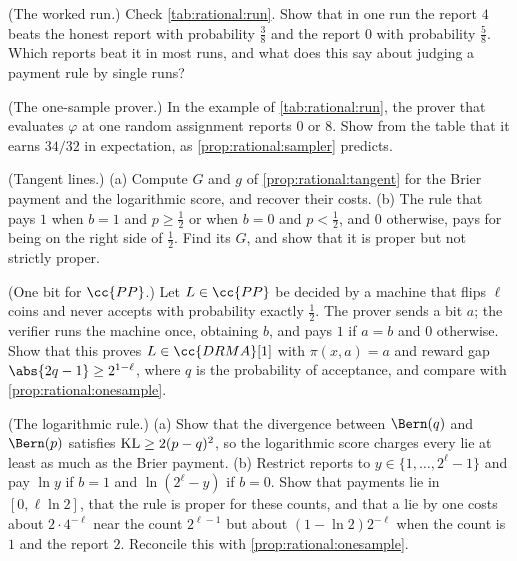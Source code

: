 \begin{refsection}
\begin{exercises}
\item \consolidation (The worked run.) Check \cref{tab:rational:run}. Show that in one run the report $4$ beats the honest report with probability $\frac38$ and the report $0$ with probability $\frac58$. Which reports beat it in most runs, and what does this say about judging a payment rule by single runs?\label{ex:rational:run}

\item \consolidation (The one-sample prover.) In the example of \cref{tab:rational:run}, the prover that evaluates $\varphi$ at one random assignment reports $0$ or $8$. Show from the table that it earns $34/32$ in expectation, as \cref{prop:rational:sampler} predicts.\label{ex:rational:onesampler}

\item \consolidation (Tangent lines.) (a) Compute $G$ and $g$ of \cref{prop:rational:tangent} for the Brier payment and the logarithmic score, and recover their costs. (b) The rule that pays $1$ when $b=1$ and $p\ge\frac12$ or when $b=0$ and $p<\frac12$, and $0$ otherwise, pays for being on the right side of $\frac12$. Find its $G$, and show that it is proper but not strictly proper.\label{ex:rational:tangent}

\item \consolidation (One bit for $\cc{PP}$.) Let $L\in\cc{PP}$ be decided by a machine that flips $\ell$ coins and never accepts with probability exactly $\frac12$. The prover sends a bit $a$; the verifier runs the machine once, obtaining $b$, and pays $1$ if $a=b$ and $0$ otherwise. Show that this proves $L\in\cc{DRMA}[1]$ with $\pi(x,a)=a$ and reward gap $\abs{2q-1}\ge2^{1-\ell}$, where $q$ is the probability of acceptance, and compare with \cref{prop:rational:onesample}.\label{ex:rational:onebit}

\item \variation (The logarithmic rule.) (a) Show that the divergence between $\Bern(q)$ and $\Bern(p)$ satisfies $\mathrm{KL}\ge2(p-q)^2$, so the logarithmic score charges every lie at least as much as the Brier payment. (b) Restrict reports to $y\in\{1,\dots,2^\ell-1\}$ and pay $\ln y$ if $b=1$ and $\ln(2^\ell-y)$ if $b=0$. Show that payments lie in $[0,\ell\ln2]$, that the rule is proper for these counts, and that a lie by one costs about $2\cdot4^{-\ell}$ near the count $2^{\ell-1}$ but about $(1-\ln2)2^{-\ell}$ when the count is $1$ and the report $2$. Reconcile this with \cref{prop:rational:onesample}. \label{ex:rational:log}


\end{exercises}
\end{refsection}
